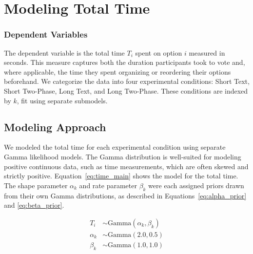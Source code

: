 \section{Modeling Total Time} \label{sec:apdx:model_time}

\subsubsection{Dependent Variables} The dependent variable is the total time $T_i$ spent on option $i$ measured in seconds. This measure captures both the duration participants took to vote and, where applicable, the time they spent organizing or reordering their options beforehand. We categorize the data into four experimental conditions: Short Text, Short Two-Phase, Long Text, and Long Two-Phase. These conditions are indexed by $k$, fit using separate submodels.

\subsection{Modeling Approach} We modeled the total time for each experimental condition using separate Gamma likelihood models. The Gamma distribution is well-suited for modeling positive continuous data, such as time measurements, which are often skewed and strictly positive. Equation~\ref{eq:time_main} shows the model for the total time. The shape parameter $\alpha_k$ and rate parameter $\beta_k$ were each assigned priors drawn from their own Gamma distributions, as described in Equations~\ref{eq:alpha_prior} and \ref{eq:beta_prior}.

\begin{align}
    T_i &\sim \text{Gamma}(\alpha_k, \beta_k) \label{eq:time_main} \\
    \alpha_k &\sim \text{Gamma}(2.0, 0.5) \label{eq:alpha_prior} \\
    \beta_k &\sim \text{Gamma}(1.0, 1.0) \label{eq:beta_prior}
\end{align}






